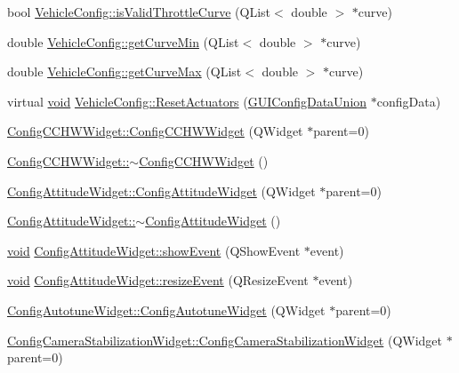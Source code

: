 \begin{DoxyCompactItemize}
bool \hyperlink{group___config_plugin_ga92da8cda852e8b2f1974cac57fbaa99f}{\-Vehicle\-Config\-::is\-Valid\-Throttle\-Curve} (\-Q\-List$<$ double $>$ $\ast$curve)
\item 
double \hyperlink{group___config_plugin_gae535c3bae8862f72e05f9247a3921b78}{\-Vehicle\-Config\-::get\-Curve\-Min} (\-Q\-List$<$ double $>$ $\ast$curve)
\item 
double \hyperlink{group___config_plugin_ga7d87a7cb73a87543dc94b23e4e4132d8}{\-Vehicle\-Config\-::get\-Curve\-Max} (\-Q\-List$<$ double $>$ $\ast$curve)
\item 
virtual \hyperlink{group___u_a_v_objects_plugin_ga444cf2ff3f0ecbe028adce838d373f5c}{void} \hyperlink{group___config_plugin_ga583ace2f123682515cbed3f87bd6e9fc}{\-Vehicle\-Config\-::\-Reset\-Actuators} (\hyperlink{union_g_u_i_config_data_union}{\-G\-U\-I\-Config\-Data\-Union} $\ast$config\-Data)
\item 
\hyperlink{group___config_plugin_ga7310551f62aff69c196b77b2680efb6b}{\-Config\-C\-C\-H\-W\-Widget\-::\-Config\-C\-C\-H\-W\-Widget} (\-Q\-Widget $\ast$parent=0)
\item 
\hyperlink{group___config_plugin_gaf57cdaf6ac0ff3096be01bbe4e6eea2b}{\-Config\-C\-C\-H\-W\-Widget\-::$\sim$\-Config\-C\-C\-H\-W\-Widget} ()
\item 
\hyperlink{group___config_plugin_ga56d10f1f43df3e0490f765a0e36eba72}{\-Config\-Attitude\-Widget\-::\-Config\-Attitude\-Widget} (\-Q\-Widget $\ast$parent=0)
\item 
\hyperlink{group___config_plugin_ga6a068a00a4c75c776ee941255797e705}{\-Config\-Attitude\-Widget\-::$\sim$\-Config\-Attitude\-Widget} ()
\item 
\hyperlink{group___u_a_v_objects_plugin_ga444cf2ff3f0ecbe028adce838d373f5c}{void} \hyperlink{group___config_plugin_ga3a79765d89dea1538f1c4393e19a2f39}{\-Config\-Attitude\-Widget\-::show\-Event} (\-Q\-Show\-Event $\ast$event)
\item 
\hyperlink{group___u_a_v_objects_plugin_ga444cf2ff3f0ecbe028adce838d373f5c}{void} \hyperlink{group___config_plugin_ga6422c7d13c247e91f9f9f9bc1d5a8531}{\-Config\-Attitude\-Widget\-::resize\-Event} (\-Q\-Resize\-Event $\ast$event)
\item 
\hyperlink{group___config_plugin_ga989f53fb20055f01ad3e2b5b08a6103f}{\-Config\-Autotune\-Widget\-::\-Config\-Autotune\-Widget} (\-Q\-Widget $\ast$parent=0)
\item 
\hyperlink{group___config_plugin_gaadc56cb83f84d7f34491592b248a111a}{\-Config\-Camera\-Stabilization\-Widget\-::\-Config\-Camera\-Stabilization\-Widget} (\-Q\-Widget $\ast$parent=0)

\end{DoxyCompactItemize}
